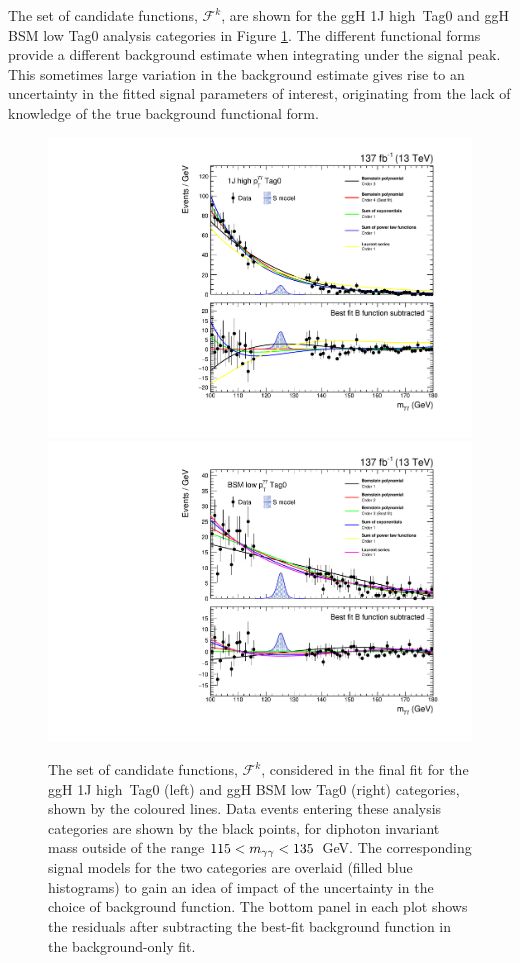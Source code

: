 The set of candidate functions, $\mathcal{F}^k$, are shown for the ggH 1J high~\ptgg Tag0 and ggH BSM low \ptgg Tag0 analysis categories in Figure \ref{fig:bkgmodels_category}. The different functional forms provide a different background estimate when integrating under the signal peak. This sometimes large variation in the background estimate gives rise to an uncertainty in the fitted signal parameters of interest, originating from the lack of knowledge of the true background functional form.

\begin{figure}[hptb]
  \centering
  \includegraphics[width=.49\textwidth]{Figures/hgg_stats/bmodel_RECO_1J_PTH_120_200_Tag0.pdf}
  \hfill
  \includegraphics[width=.49\textwidth]{Figures/hgg_stats/bmodel_RECO_PTH_200_300_Tag0.pdf}
  \caption[Background models for the 1J high \ptgg Tag0 and qqH VH-like Tag0 categories]
  {
    The set of candidate functions, $\mathcal{F}^k$, considered in the final fit for the ggH 1J high~\ptgg Tag0 (left) and ggH BSM low \ptgg Tag0 (right) categories, shown by the coloured lines. Data events entering these analysis categories are shown by the black points, for diphoton invariant mass outside of the range $115<m_{\gamma\gamma}<135$~GeV. The corresponding signal models for the two categories are overlaid (filled blue histograms) to gain an idea of impact of the uncertainty in the choice of background function. The bottom panel in each plot shows the residuals after subtracting the best-fit background function in the background-only fit.
  }
  \label{fig:bkgmodels_category}
\end{figure}

